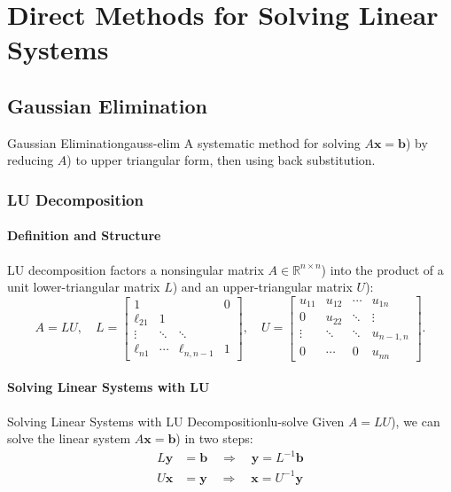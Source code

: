 \chapter{Direct Methods for Solving Linear Systems}
\label{ch:direct-linsys}

\section{Gaussian Elimination}

\begin{theorem}{Gaussian Elimination}{gauss-elim}
    A systematic method for solving \(A\mathbf{x} = \mathbf{b}\)) by reducing \(A\)) to upper triangular form, then using back substitution.
\end{theorem}

\subsection{LU Decomposition}

\subsubsection{Definition and Structure}
LU decomposition factors a nonsingular matrix \(A\in\mathbb{R}^{n\times n}\)) into the product of a unit lower-triangular matrix \(L\)) and an upper-triangular matrix \(U\)):
\[
    A = LU,
    \quad
    L = \begin{bmatrix}
        1         &        &              & 0 \\
        \ell_{21} & 1      &              &   \\
        \vdots    & \ddots & \ddots       &   \\
        \ell_{n1} & \cdots & \ell_{n,n-1} & 1
    \end{bmatrix},
    \quad
    U = \begin{bmatrix}
        u_{11} & u_{12} & \cdots & u_{1n}    \\
        0      & u_{22} & \ddots & \vdots    \\
        \vdots & \ddots & \ddots & u_{n-1,n} \\
        0      & \cdots & 0      & u_{nn}
    \end{bmatrix}.
\]

\subsubsection{Solving Linear Systems with LU}
\begin{definition}{Solving Linear Systems with LU Decomposition}{lu-solve}
    Given \(A = LU\)), we can solve the linear system \(A\mathbf{x} = \mathbf{b}\)) in two steps:
    \begin{align*}
        L\mathbf{y} & = \mathbf{b} \quad \Rightarrow \quad \mathbf{y} = L^{-1}\mathbf{b} \tag{forward substitution} \\
        U\mathbf{x} & = \mathbf{y} \quad \Rightarrow \quad \mathbf{x} = U^{-1}\mathbf{y} \tag{back substitution}
    \end{align*}
\end{definition}

